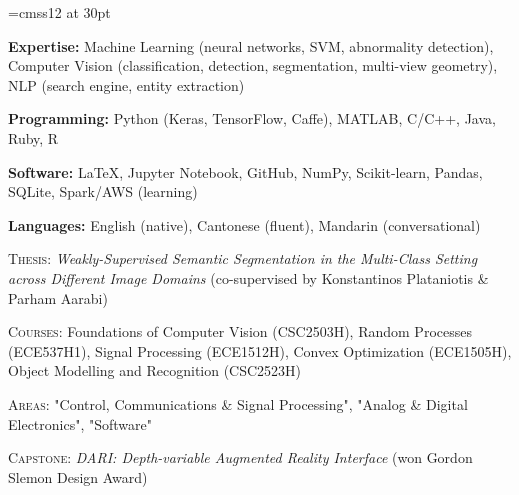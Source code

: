 \documentclass[letterpaper, 12pt]{cv_style}
\begin{document}
\font\titlefont=cmss12 at 30pt


\begin{ditem}
	\item \textbf{Expertise:} Machine Learning (neural networks, SVM, abnormality detection), Computer Vision (classification, detection, segmentation, multi-view geometry), NLP (search engine, entity extraction)
	\item \textbf{Programming:} Python (Keras, TensorFlow, Caffe), MATLAB, C/C++, Java, Ruby, R
	\item \textbf{Software:} \LaTeX, Jupyter Notebook, GitHub, NumPy, Scikit-learn, Pandas, SQLite, Spark/AWS (learning)
	\item \textbf{Languages:} English (native), Cantonese (fluent), Mandarin (conversational)
\end{ditem}

\flushleft{}
\begin{ditem}
	\item \textsc{Thesis:} \textit{Weakly-Supervised Semantic Segmentation in the Multi-Class Setting across Different Image Domains} (co-supervised by Konstantinos Plataniotis \& Parham Aarabi)
	\item \textsc{Courses:} Foundations of Computer Vision (CSC2503H), Random Processes (ECE537H1), Signal Processing (ECE1512H), Convex Optimization (ECE1505H), Object Modelling and Recognition (CSC2523H)
\end{ditem}
\medspace
{}
\begin{ditem}
	\item \textsc{Areas:} "Control, Communications \& Signal Processing", "Analog \& Digital Electronics", "Software"
	\item \textsc{Capstone:} \textit{DARI: Depth-variable Augmented Reality Interface} (won Gordon Slemon Design Award)
\end{ditem}
\end{document}
